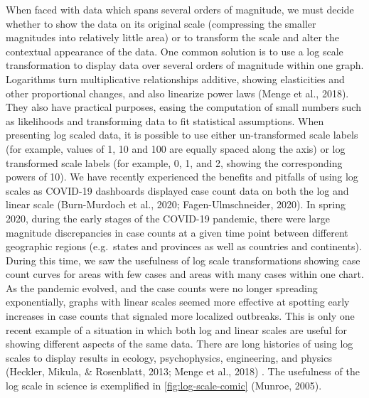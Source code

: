\documentclass[print]{nuthesis}
\begin{document}
When faced with data which spans several orders of magnitude, we must decide whether to show the data on its original
scale (compressing the smaller magnitudes into relatively little area) or to transform the scale and alter the contextual appearance of the data.
One common solution is to use a log scale transformation to display data over several orders of magnitude within one graph.
Logarithms turn multiplicative relationships additive, showing elasticities and other proportional changes, and also linearize power laws (Menge et al., 2018).
They also have practical purposes, easing the computation of small numbers such as likelihoods and transforming data to fit statistical assumptions.
When presenting log scaled data, it is possible to use either un-transformed scale labels (for example, values of 1, 10 and 100 are equally spaced along the axis) or log transformed scale labels (for example, 0, 1, and 2, showing the corresponding powers of 10).
We have recently experienced the benefits and pitfalls of using log scales as COVID-19 dashboards displayed
case count data on both the log and linear scale (Burn-Murdoch et al., 2020; Fagen-Ulmschneider, 2020). In spring 2020, during the early stages of the COVID-19 pandemic, there were large magnitude discrepancies in case counts at a given time point between different geographic regions (e.g.~states and provinces as well as countries and continents).
During this time, we saw the usefulness of log scale transformations showing case count curves for areas with few cases and areas with many cases within one chart.
As the pandemic evolved, and the case counts were no longer spreading exponentially, graphs with linear scales seemed more effective at spotting early increases in case counts that signaled more localized outbreaks.
This is only one recent example of a situation in which both log and linear scales are useful for showing different aspects of the same data. There are long histories of using log scales to display results in ecology, psychophysics, engineering, and physics (Heckler, Mikula, \& Rosenblatt, 2013; Menge et al., 2018) . The usefulness of the log scale in science is exemplified in \cref{fig:log-scale-comic} (Munroe, 2005).
\end{document}
